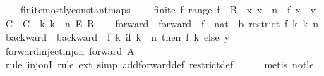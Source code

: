 \begin{isabellebody}
\ \ \ \ finite{\isacharunderscore}{\kern0pt}mostly{\isacharunderscore}{\kern0pt}constant{\isacharunderscore}{\kern0pt}maps{\isacharcolon}{\kern0pt}\isanewline
\ \ \ \ {\isachardoublequoteopen}finite\ {\isacharbraceleft}{\kern0pt}f{\isachardot}{\kern0pt}\ range\ f\ {\isasymsubseteq}\ B\ {\isasymand}\ {\isacharparenleft}{\kern0pt}{\isasymforall}x{\isachardot}{\kern0pt}\ x\ {\isasymge}\ n\ {\isasymlongrightarrow}\ f\ x\ {\isacharequal}{\kern0pt}\ y{\isacharparenright}{\kern0pt}{\isacharbraceright}{\kern0pt}{\isachardoublequoteclose}\isanewline
%
\isadelimproof
%
\endisadelimproof
%
\isatagproof
{}\isamarkupfalse%
\ {\isacharminus}{\kern0pt}\isanewline
\ \ \isamarkupfalse%
\ C\ \ {\isachardoublequoteopen}C\ {\isacharequal}{\kern0pt}\ {\isacharbraceleft}{\kern0pt}k{\isachardot}{\kern0pt}\ k\ {\isacharless}{\kern0pt}\ n{\isacharbraceright}{\kern0pt}\ {\isasymrightarrow}\isactrlsub E\ B{\isachardoublequoteclose}\isanewline
\ \ \isamarkupfalse%
\ forward\ \ {\isachardoublequoteopen}forward\ {\isacharequal}{\kern0pt}\ {\isacharparenleft}{\kern0pt}{\isasymlambda}{\isacharparenleft}{\kern0pt}f\ {\isacharcolon}{\kern0pt}{\isacharcolon}{\kern0pt}\ nat\ {\isasymRightarrow}\ {\isacharprime}{\kern0pt}b{\isacharparenright}{\kern0pt}{\isachardot}{\kern0pt}\ restrict\ f\ {\isacharbraceleft}{\kern0pt}k{\isachardot}{\kern0pt}\ k{\isacharless}{\kern0pt}\ n{\isacharbraceright}{\kern0pt}{\isacharparenright}{\kern0pt}{\isachardoublequoteclose}\isanewline
\ \ \isamarkupfalse%
\ backward\ \ {\isachardoublequoteopen}backward\ {\isacharequal}{\kern0pt}\ {\isacharparenleft}{\kern0pt}{\isasymlambda}f\ k{\isachardot}{\kern0pt}\ if\ k\ {\isacharless}{\kern0pt}\ n\ then\ f\ k\ else\ y{\isacharparenright}{\kern0pt}{\isachardoublequoteclose}\isanewline
\isanewline
\ \ \isamarkupfalse%
\ forward{\isacharunderscore}{\kern0pt}inject{\isacharcolon}{\kern0pt}{\isachardoublequoteopen}inj{\isacharunderscore}{\kern0pt}on\ forward\ {\isacharquery}{\kern0pt}A{\isachardoublequoteclose}\isanewline
\ \ \ \ \isamarkupfalse%
\ {\isacharparenleft}{\kern0pt}rule\ inj{\isacharunderscore}{\kern0pt}onI{\isacharcomma}{\kern0pt}\ rule\ ext{\isacharcomma}{\kern0pt}\ simp\ add{\isacharcolon}{\kern0pt}forward{\isacharunderscore}{\kern0pt}def\ restrict{\isacharunderscore}{\kern0pt}def{\isacharparenright}{\kern0pt}\isanewline
\ \ \ \ \isamarkupfalse%
\ {\isacharparenleft}{\kern0pt}metis\ not{\isacharunderscore}{\kern0pt}le{\isacharparenright}{\kern0pt}\isanewline

\end{isabellebody}

